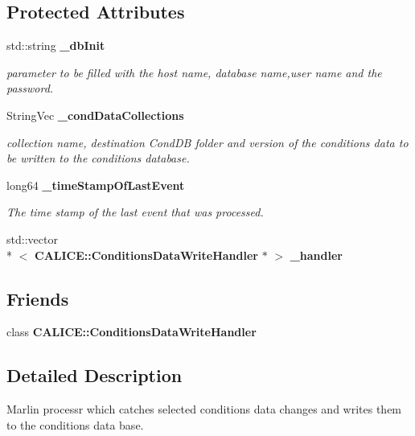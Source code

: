 \subsection*{Protected Attributes}
\begin{DoxyCompactItemize}
\item 
std\-::string {\bf \-\_\-db\-Init}
\begin{DoxyCompactList}\small\item\em parameter to be filled with the host name, database name,user name and the password. \end{DoxyCompactList}\item 
String\-Vec {\bf \-\_\-cond\-Data\-Collections}
\begin{DoxyCompactList}\small\item\em collection name, destination Cond\-D\-B folder and version of the conditions data to be written to the conditions database. \end{DoxyCompactList}\item 
long64 {\bf \-\_\-time\-Stamp\-Of\-Last\-Event}
\begin{DoxyCompactList}\small\item\em The time stamp of the last event that was processed. \end{DoxyCompactList}\item 
std\-::vector\\*
$<$ {\bf C\-A\-L\-I\-C\-E\-::\-Conditions\-Data\-Write\-Handler} $\ast$ $>$ {\bfseries \-\_\-handler}\label{classmarlin_1_1ConditionsDataWriter_a68d96e4787ed480558b5b3088cd3321f}

\end{DoxyCompactItemize}
\subsection*{Friends}
\begin{DoxyCompactItemize}
\item 
class {\bfseries C\-A\-L\-I\-C\-E\-::\-Conditions\-Data\-Write\-Handler}\label{classmarlin_1_1ConditionsDataWriter_a0e401bb1bfedeba5808934499877adf4}

\end{DoxyCompactItemize}


\subsection{Detailed Description}
Marlin processr which catches selected conditions data changes and writes them to the conditions data base. 

